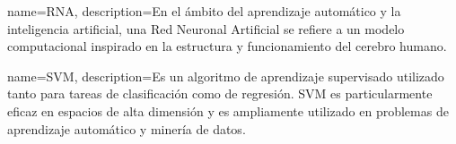 {
	name=RNA,
	description={En el ámbito del aprendizaje automático y la inteligencia artificial, una Red Neuronal Artificial se refiere a un modelo computacional inspirado en la estructura y funcionamiento del cerebro humano. } 
}

{
	name=SVM,
	description={Es un algoritmo de aprendizaje supervisado utilizado tanto para tareas de clasificación como de regresión. SVM es particularmente eficaz en espacios de alta dimensión y es ampliamente utilizado en problemas de aprendizaje automático y minería de datos.} 
}
